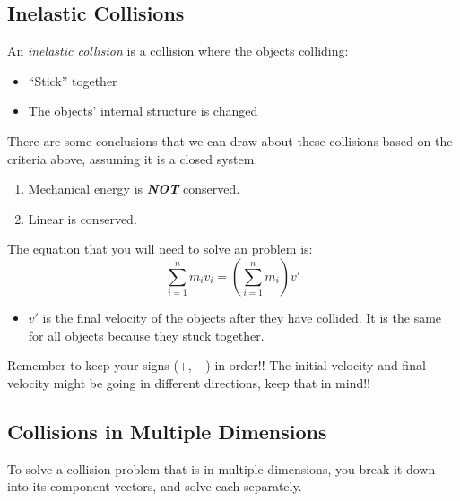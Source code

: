 \subsection{Inelastic Collisions}\label{subsuec:Inelastic Collisions}
\begin{definition}\label{def:Inelastic Collision}
  An \emph{inelastic collision} is a collision where the objects colliding:

  \begin{itemize}[noitemsep, nolistsep]
    \item ``Stick'' together
    \item The objects' internal structure is changed
  \end{itemize}

  There are some conclusions that we can draw about these collisions based on the criteria above, assuming it is a closed system.
  \begin{enumerate}
    \item Mechanical energy is \textbf{\emph{NOT}} conserved.
    \item Linear  is conserved.
  \end{enumerate}

  The equation that you will need to solve an  problem is:
  \begin{equation}\label{eq:Inelastic Collision}
    \sum\limits_{i=1}^{n} m_{i}v_{i} = \left( \sum\limits_{i=1}^{n} m_{i} \right) v'
  \end{equation}

  \begin{itemize}[noitemsep, nolistsep]
    \item $v'$ is the final velocity of the objects after they have collided. It is the same for all objects because they stuck together.
  \end{itemize}

  \begin{remark}
    Remember to keep your signs ($+$, $-$) in order!!
    The initial velocity and final velocity might be going in different directions, keep that in mind!!
  \end{remark}
\end{definition}

\subsection{Collisions in Multiple Dimensions}\label{subsec:Multi-D Collisions}
To solve a collision problem that is in multiple dimensions, you break it down into its component vectors, and solve each separately.

